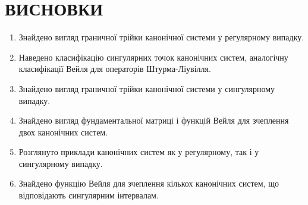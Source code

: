 
\section*{ВИСНОВКИ}

\begin{enumerate}
	\item Знайдено вигляд граничної трійки канонічної системи у регулярному випадку.
	\item Наведено класифікацію сингулярних точок канонічних систем, аналогічну класифікації Вейля для операторів Штурма-Ліувілля.
	\item Знайдено вигляд граничної трійки канонічної системи у сингулярному випадку.
	\item Знайдено вигляд фундаментальної матриці і функцій Вейля для зчеплення двох канонічних систем.
	\item Розглянуто приклади канонічних систем як у регулярному, так і у сингулярному випадку.
	\item Знайдено функцію Вейля для зчеплення кількох канонічних систем, що відповідають сингулярним інтервалам.
\end{enumerate}